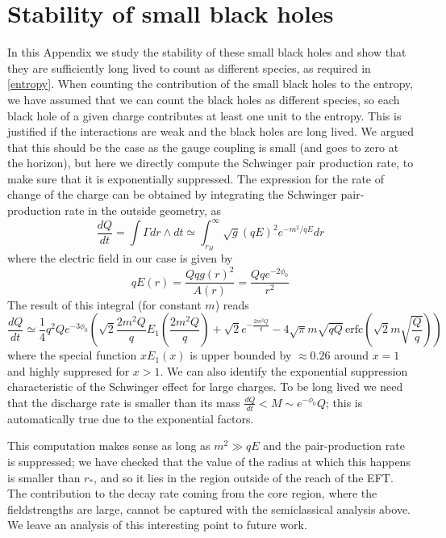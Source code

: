 \documentclass[11pt]{article}
\numberwithin{equation}{section}
\newcommand{\beq}{\begin{equation}}  \newcommand{\eeq}{\end{equation}}
\numberwithin{equation}{section}
\theoremstyle{remark}
\begin{document}
\section{Stability of small black holes}
In this Appendix we study the stability of these small black holes and show that they are sufficiently long lived to count as different species, as required in \eqref{entropy}.
When counting the contribution of the small black holes to the entropy, we have assumed that we can count the black holes as different species, so each black hole of a given charge contributes at least one unit to the entropy. This is justified if the interactions are weak and the black holes are long lived. We argued that this should be the case as the gauge coupling is small (and goes to zero at the horizon), but here we directly compute the Schwinger pair production rate, to make sure that it is exponentially suppressed. The expression for the rate of change of the charge can be obtained by integrating the Schwinger pair-production rate in the outside geometry, as
\beq
\frac{dQ}{dt}= \int \Gamma dr\wedge dt\simeq \int_{r_H}^\infty \sqrt{g} (qE)^2e^{-m^2/qE} dr
\eeq
where the electric field in our case is given by
\beq
qE(r)=\frac{Qqg(r)^2}{A(r)}=\frac{Qqe^{-2\phi_0}}{r^2}
\eeq
The result of this integral (for constant $m$) reads
\beq
\frac{dQ}{dt}\simeq \frac{1}{4} q^2 Q e^{-3\phi_0} \left(\sqrt{2}  \frac{2m^2 Q}{q} E_1\left(\frac{2 m^2 Q}{q}\right)+\sqrt{2} e^{-\frac{2 m^2 Q}{q}}-4 \sqrt{\pi } m \sqrt{q Q}\, \text{erfc}\left(\sqrt{2} m \sqrt{\frac{Q}{q}}\right)\right)
\eeq
where the special function $xE_1(x)$ is upper bounded by $\approx 0.26$ around $x=1$ and highly suppresed for $x>1$. We can also identify the exponential suppression characteristic of the Schwinger effect for large charges. To be long lived we need that the discharge rate is smaller than its mass $\frac{dQ}{dt}<M\sim e^{-\phi_0}Q$; this is automatically true due to the exponential factors.

This computation makes sense as long as $m^2\gg qE$ and the pair-production rate is suppressed; we have checked that the value of the radius at which this happens is smaller than $r_*$, and so it lies in the region outside of the reach of the EFT. The contribution to the decay rate coming from the core region, where the fieldstrengths are large, cannot be captured with the semiclassical analysis above. We leave an analysis of this interesting point to future work. 


\end{document}
